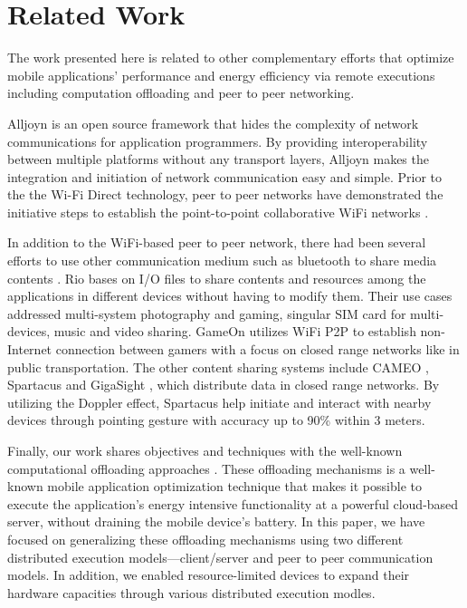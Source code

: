 \documentclass{sig-alternate}
\begin{document}

\section{Related Work}
\label{sec:related}
The work presented here is related to other complementary efforts that optimize mobile applications' performance and energy efficiency via remote executions including computation offloading and peer to peer networking.

Alljoyn \cite{alljoyn} is an open source framework that hides the complexity of network communications for application programmers. By providing interoperability between multiple platforms without any transport layers, Alljoyn makes the integration and initiation of network communication easy and simple. Prior to the the Wi-Fi Direct technology, peer to peer networks have demonstrated the initiative steps to establish the point-to-point collaborative WiFi networks \cite{m_p2p_tutor}. 

In addition to the WiFi-based peer to peer network, there had been several efforts to use other communication medium such as bluetooth to share media contents \cite{media_share}. Rio \cite{rio} bases on I/O files to share contents and resources among the applications in different devices without having to modify them. Their use cases addressed multi-system photography and gaming, singular SIM card for multi-devices, music and video sharing. GameOn \cite{gameon} utilizes WiFi P2P to establish non-Internet connection between gamers with a focus on closed range networks like in public transportation. The other content sharing systems include CAMEO \cite{cameo}, Spartacus \cite{spartacus} and GigaSight \cite{crowd-sourcing}, which distribute data in closed range networks. By utilizing the Doppler effect, Spartacus help initiate and interact with nearby devices through pointing gesture with accuracy up to 90\% within 3 meters.

Finally, our work shares objectives and techniques with the well-known computational offloading approaches \cite{maui,comet,mobile-cloud-middleware,fuzzy-engine}. These offloading mechanisms is a well-known mobile application optimization technique that makes it possible to execute the application's energy intensive functionality at a powerful cloud-based server, without draining the mobile device's battery. In this paper, we have focused on generalizing these offloading mechanisms using two different distributed execution models---client/server and peer to peer communication models. In addition, we enabled resource-limited devices to expand their hardware capacities through various distributed execution modles.
\end{document}
